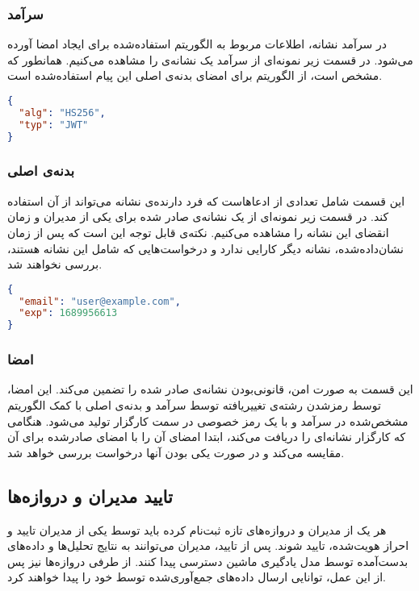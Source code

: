 \subsubsection{سرآمد}
در سرآمد نشانه، اطلاعات مربوط به الگوریتم استفاده‌شده برای ایجاد امضا آورده می‌شود. در قسمت زیر نمونه‌ای از سرآمد یک نشانه‌ی  را مشاهده می‌کنیم. همانطور که مشخص است، از الگوریتم  برای امضای بدنه‌ی اصلی این پیام استفاده‌شده است.

\begin{latin}
\begin{lstlisting}[language=json,firstnumber=1]
{
  "alg": "HS256",
  "typ": "JWT"
}
\end{lstlisting}
\end{latin}

\subsubsection{بدنه‌ی اصلی}
این قسمت شامل تعدادی از ادعاهاست که فرد دارنده‌ی نشانه می‌تواند از آن استفاده کند. در قسمت زیر نمونه‌ای از یک نشانه‌ی صادر شده برای یکی از مدیران و زمان انقضای این نشانه را مشاهده می‌کنیم. نکته‌ی قابل توجه این است که پس از زمان نشان‌داده‌شده، نشانه دیگر کارایی ندارد و درخواست‌هایی که شامل این نشانه هستند، بررسی نخواهند شد.

\begin{latin}
\begin{lstlisting}[language=json,firstnumber=1]
{
  "email": "user@example.com",
  "exp": 1689956613
}
\end{lstlisting}
\end{latin}

\subsubsection{امضا}
این قسمت به صورت امن، قانونی‌بودن نشانه‌ی صادر شده را تضمین می‌کند. این امضا، توسط رمزشدن رشته‌ی تغییر‌یافته توسط  سرآمد و بدنه‌ی اصلی با کمک الگوریتم مشخص‌شده در سرآمد و با یک رمز خصوصی در سمت کارگزار تولید می‌شود. هنگامی که کارگزار نشانه‌ای را دریافت می‌کند، ابتدا امضای آن را با امضای صادرشده برای آن مقایسه می‌کند و در صورت یکی بودن آنها درخواست بررسی خواهد شد.


\subsection{تایید مدیران و دروازه‌ها}
هر یک از مدیران و دروازه‌های تازه ثبت‌نام کرده باید توسط یکی از مدیران تایید‌ و احراز هویت‌شده، تایید شوند. پس از تایید، مدیران می‌توانند به نتایج تحلیل‌ها و داده‌های بدست‌آمده توسط مدل یادگیری ماشین دسترسی پیدا کنند. از طرفی دروازه‌ها نیز پس از این عمل، توانایی ارسال داده‌های جمع‌آوری‌شده توسط خود را پیدا خواهند کرد. 

